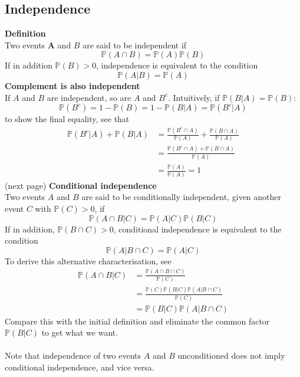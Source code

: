 \documentclass{report}
\begin{document}
\subsection{Independence}
\textbf{Definition}\\
Two events $\bm A$ and $B$ are said to be independent if
\begin{equation*}
\mathbb P(A\cap B)=\mathbb P(A)\mathbb P(B)
\end{equation*}
If in addition $\mathbb P(B)>0$, independence is equivalent to the condition
\begin{equation*}
\mathbb P(A|B)=\mathbb P(A)
\end{equation*}
\textbf{Complement is also independent}\\
If $A$ and $B$ are independent, so are $A$ and $B^c$. Intuitively, if $\mathbb P(B|A)=\mathbb P(B)$:
\begin{equation*}
\mathbb P(B^c)=1-\mathbb P(B)=1-\mathbb P(B|A)=\mathbb P(B^c|A)
\end{equation*}
to show the final equality, see that 
\begin{align*}
\mathbb P(B^c|A)+\mathbb P(B|A)&=\frac{\mathbb P(B^c\cap A)}{\mathbb P(A)}+\frac{\mathbb P(B\cap A)}{\mathbb P(A)}\\
&=\frac{\mathbb P(B^c\cap A)+\mathbb P(B\cap A)}{\mathbb P(A)}\\
&=\frac{\mathbb P(A)}{\mathbb P(A)}=1
\end{align*}
(next page)\newpage
\noindent\textbf{Conditional independence}\\
Two events $A$ and $B$ are said to be conditionally independent, given another event $C$ with $\mathbb P(C)>0$, if
\begin{equation*}
\mathbb P(A\cap B|C)=\mathbb P(A|C)\mathbb P(B|C)
\end{equation*}
If in addition, $\mathbb P(B\cap C)>0$, conditional independence is equivalent to the condition
\begin{equation*}
\mathbb P(A|B\cap C)=\mathbb P(A|C)
\end{equation*}
To derive this alternative characterisation, see
\begin{align*}
\mathbb P(A\cap B|C)&=\frac{\mathbb P(A\cap B\cap C)}{\mathbb P(C)}\\
&=\frac{\mathbb P(C)\mathbb P(B|C)\mathbb P(A|B\cap C)}{\mathbb P(C)}\\
&=\mathbb P(B|C)\mathbb P(A|B\cap C)
\end{align*}
Compare this with the initial definition and eliminate the common factor $\mathbb P(B|C)$ to get what we want.\\
\vspace{1mm}\\
Note that independence of two events $A$ and $B$ unconditioned does not imply conditional independence, and vice versa.
\end{document}
